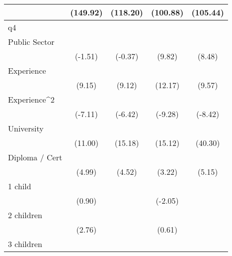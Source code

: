 {\begin{tabular}{l*{4}{c}}
                    &    (149.92)         &    (118.20)         &    (100.88)         &    (105.44)         \\
\hline
q4                  &                     &                     &                     &                     \\
Public Sector       &                     &                     &            \sym{***}&            \sym{***}\\
                    &     (-1.51)         &     (-0.37)         &      (9.82)         &      (8.48)         \\
[1em]
Experience          &            \sym{***}&            \sym{***}&            \sym{***}&            \sym{***}\\
                    &      (9.15)         &      (9.12)         &     (12.17)         &      (9.57)         \\
[1em]
Experience^{2}      &            \sym{***}&            \sym{***}&            \sym{***}&            \sym{***}\\
                    &     (-7.11)         &     (-6.42)         &     (-9.28)         &     (-8.42)         \\
[1em]
University          &            \sym{***}&            \sym{***}&            \sym{***}&            \sym{***}\\
                    &     (11.00)         &     (15.18)         &     (15.12)         &     (40.30)         \\
[1em]
Diploma / Cert      &            \sym{***}&            \sym{***}&            \sym{**} &            \sym{***}\\
                    &      (4.99)         &      (4.52)         &      (3.22)         &      (5.15)         \\
[1em]
1 child             &                     &                     &            \sym{*}  &                     \\
                    &      (0.90)         &                     &     (-2.05)         &                     \\
[1em]
2 children          &            \sym{**} &                     &                     &                     \\
                    &      (2.76)         &                     &      (0.61)         &                     \\
[1em]
3 children          &            \sym{*}  &                     &                     &                     \\

\end{tabular}}
